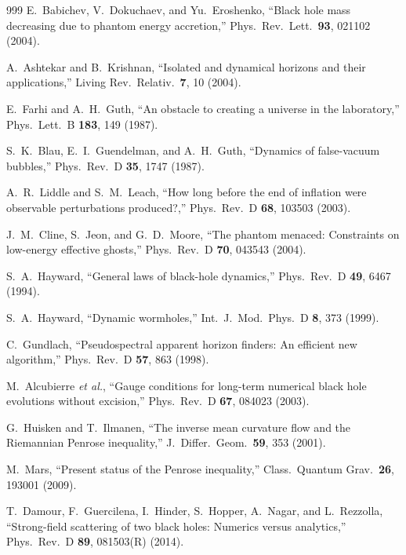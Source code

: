\documentclass[twocolumn,floatfix,aps,prd,superscriptaddress,nofootinbib]{revtex4-2}
\begin{document}
\begin{thebibliography}{999}
E.~Babichev, V.~Dokuchaev, and Yu.~Eroshenko,
\newblock ``Black hole mass decreasing due to phantom energy accretion,''
\newblock Phys.\ Rev.\ Lett.\ \textbf{93}, 021102 (2004).


A.~Ashtekar and B.~Krishnan,
\newblock ``Isolated and dynamical horizons and their applications,''
\newblock Living Rev.\ Relativ.\ \textbf{7}, 10 (2004).

E.~Farhi and A.~H.~Guth,
\newblock ``An obstacle to creating a universe in the laboratory,''
\newblock Phys.\ Lett.\ B \textbf{183}, 149 (1987).

S.~K.~Blau, E.~I.~Guendelman, and A.~H.~Guth,
\newblock ``Dynamics of false-vacuum bubbles,''
\newblock Phys.\ Rev.\ D \textbf{35}, 1747 (1987).

A.~R.~Liddle and S.~M.~Leach,
\newblock ``How long before the end of inflation were observable perturbations produced?,''
\newblock Phys.\ Rev.\ D \textbf{68}, 103503 (2003).

J.~M.~Cline, S.~Jeon, and G.~D.~Moore,
\newblock ``The phantom menaced: Constraints on low-energy effective ghosts,''
\newblock Phys.\ Rev.\ D \textbf{70}, 043543 (2004).

S.~A.~Hayward,
\newblock ``General laws of black-hole dynamics,''
\newblock Phys.\ Rev.\ D \textbf{49}, 6467 (1994).

S.~A.~Hayward,
\newblock ``Dynamic wormholes,''
\newblock Int.\ J.\ Mod.\ Phys.\ D \textbf{8}, 373 (1999).

C.~Gundlach,
\newblock ``Pseudospectral apparent horizon finders: An efficient new algorithm,''
\newblock Phys.\ Rev.\ D \textbf{57}, 863 (1998).

M.~Alcubierre \emph{et al.},
\newblock ``Gauge conditions for long-term numerical black hole evolutions without excision,''
\newblock Phys.\ Rev.\ D \textbf{67}, 084023 (2003).

G.~Huisken and T.~Ilmanen,
\newblock ``The inverse mean curvature flow and the Riemannian Penrose inequality,''
\newblock J.\ Differ.\ Geom.\ \textbf{59}, 353 (2001).

M.~Mars,
\newblock ``Present status of the Penrose inequality,''
\newblock Class.\ Quantum Grav.\ \textbf{26}, 193001 (2009).

T.~Damour, F.~Guercilena, I.~Hinder, S.~Hopper, A.~Nagar, and L.~Rezzolla,
\newblock ``Strong-field scattering of two black holes: Numerics versus analytics,''
\newblock Phys.\ Rev.\ D \textbf{89}, 081503(R) (2014).


\end{thebibliography}
\end{document}
